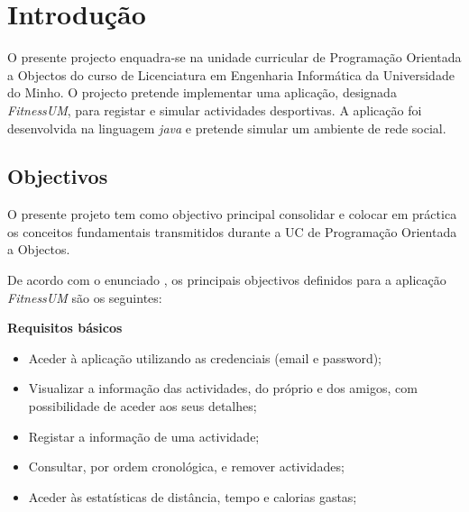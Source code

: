 \documentclass[a4paper,10pt]{report}
\begin{document}

\newpage
\phantom{placeholder} %
\thispagestyle{empty} %
\tableofcontents
\phantom{placeholder} %
\thispagestyle{empty} %
\newpage
\phantom{placeholder} %
\thispagestyle{empty} %
\pagestyle{fancy}
\setlength{\headheight}{15.2pt}
\fancyhf{} %
\fancyfoot[LE,RO]{\thepage}
\setcounter{page}{0}

\chapter{Introdução}
\label{cap:intro}
O presente projecto enquadra-se na unidade curricular de Programação Orientada a Objectos do curso de Licenciatura em Engenharia 
Informática da Universidade do Minho.
O projecto pretende implementar uma aplicação, designada \emph{FitnessUM}, para registar e simular actividades desportivas.
A aplicação foi desenvolvida na linguagem \emph{java} e pretende simular um ambiente de rede social.

\section{Objectivos}
\label{sec:obj}
O presente projeto tem como objectivo principal consolidar e colocar em práctica os conceitos fundamentais transmitidos durante a UC de 
Programação Orientada a Objectos.

De acordo com o enunciado \cite{enunciado}, os principais objectivos definidos para a aplicação \emph{FitnessUM} são os seguintes:

\textbf{Requisitos básicos}
\begin{itemize}
\item Aceder à aplicação utilizando as credenciais (email e password);
\item Visualizar a informação das actividades, do próprio e dos amigos, com possibilidade de aceder aos seus detalhes; 
\item Registar a informação de uma actividade;
\item Consultar, por ordem cronológica, e remover actividades;  
\item Aceder às estatísticas de distância, tempo e calorias gastas;
\end{itemize}
\end{document}
